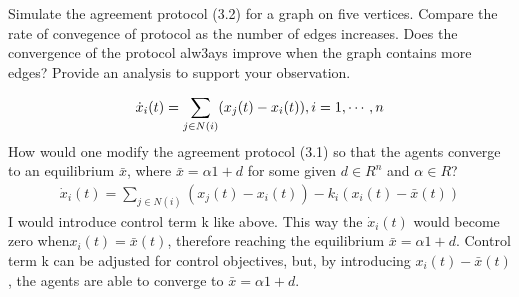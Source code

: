 \documentclass{article}
\begin{document}
\begin{problem}
    Simulate the agreement protocol (3.2) for a graph on five vertices. Compare the rate of convegence of protocol as the number of edges increases. Does the convergence of the protocol alw3ays improve when the graph contains more edges? Provide an analysis to support your observation. 

\end{problem}

\begin{problem}
    \begin{align*}
        \dot{x}_i(t) = \sum_{j \in N(i)} (x_j(t) - x_i(t)), \space i = 1, \cdots , n
    \end{align*}
    How would one modify the agreement protocol (3.1) so that the agents converge to an equilibrium $\bar{x}$, where $\bar{x} = \alpha 1 + d$ for some given $d \in R^n$ and $\alpha \in R$?
    \begin{align*}
        \dot{x}_i(t) = \sum_{j \in N(i)} (x_j(t) - x_i(t)) - k_i(x_i(t) - \bar{x}(t))
    \end{align*}
    I would introduce control term k like above. This way the $\dot{x}_i(t)$ would become zero when$ x_i(t) = \bar{x}(t)$, therefore reaching the equilibrium $\bar{x} = \alpha 1 + d$.
    Control term k can be adjusted for control objectives, but, by introducing $x_i(t) - \bar{x}(t)$, the agents are able to converge to  $\bar{x} = \alpha 1 + d$.
\end{problem}
\end{document}
